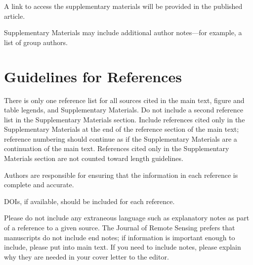 \documentclass{article}
\begin{document}
A link to access the supplementary materials will be provided in the published article.

Supplementary Materials may include additional author notes—for example, a list of group authors.

\section*{Guidelines for References}

There is only one reference list for all sources cited in the main text, figure and table legends, and Supplementary Materials. Do not include a second reference list in the Supplementary Materials section. Include references cited only in the Supplementary Materials at the end of the reference section of the main text; reference numbering should continue as if the Supplementary Materials are a continuation of the main text. References cited only in the Supplementary Materials section are not counted toward length guidelines.

Authors are responsible for ensuring that the information in each reference is complete and accurate.

DOIs, if available, should be included for each reference.

Please do not include any extraneous language such as explanatory notes as part of a reference to a given source. The Journal of Remote Sensing prefers that manuscripts do not include end notes; if information is important enough to include, please put into main text.  If you need to include notes, please explain why they are needed in your cover letter to the editor.

\printbibliography
\end{document}
